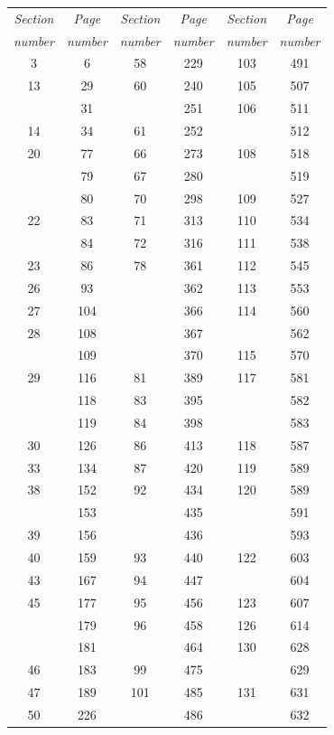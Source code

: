 \begin{small}
\begin{center}
\begin{tabular}{cc@{\qquad}cc@{\qquad}cc}
\textit{Section} & \textit{Page} & \textit{Section} & \textit{Page} & \textit{Section} & \textit{Page} \\
\textit{number} & \textit{number} & \textit{number} & \textit{number} & \textit{number} & \textit{number} \\[3pt]
3 & 6 & 58 & 229 & 103 & 491 \\
13 & 29 & 60 & 240 & 105 & 507 \\
  & 31 &   & 251 & 106 & 511 \\
14 & 34 & 61 & 252 &   & 512 \\
20 & 77 & 66 & 273 & 108 & 518 \\
  & 79 & 67 & 280 &   & 519 \\
  & 80 & 70 & 298 & 109 & 527 \\
22 & 83 & 71 & 313 & 110 & 534 \\
  & 84 & 72 & 316 & 111 & 538 \\
23 & 86 & 78 & 361 & 112 & 545 \\
26 & 93 &   & 362 & 113 & 553 \\
27 & 104 &   & 366 & 114 & 560 \\
28 & 108 &   & 367 &   & 562 \\
  & 109 &   & 370 & 115 & 570 \\
29 & 116 & 81 & 389 & 117 & 581 \\
  & 118 & 83 & 395 &   & 582 \\
  & 119 & 84 & 398 &   & 583 \\
30 & 126 & 86 & 413 & 118 & 587 \\
33 & 134 & 87 & 420 & 119 & 589 \\
38 & 152 & 92 & 434 & 120 & 589 \\
  & 153 &   & 435 &   & 591 \\
39 & 156 &   & 436 &   & 593 \\
40 & 159 & 93 & 440 & 122 & 603 \\
43 & 167 & 94 & 447 &   & 604 \\
45 & 177 & 95 & 456 & 123 & 607 \\
  & 179 & 96 & 458 & 126 & 614 \\
  & 181 &   & 464 & 130 & 628 \\
46 & 183 & 99 & 475 &   & 629 \\
47 & 189 & 101 & 485 & 131 & 631 \\
50 & 226 &   & 486 &   & 632 \\
\end{tabular}
\end{center}
\end{small}
